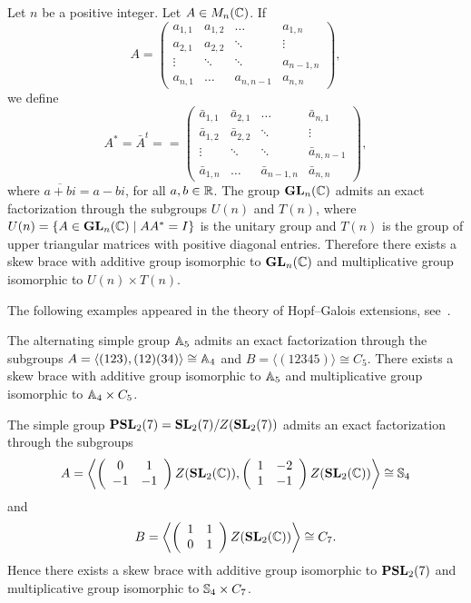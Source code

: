 \begin{example}
  \label{exa:QR}
  Let $n$ be a positive integer.  Let $A\in M_n(\mathbb{C})$. If 
  \[A=\left(\begin{array}{cccc}
  a_{1,1}&a_{1,2}&\ldots &a_{1,n}\\
  a_{2,1}&a_{2,2}&\ddots&\vdots\\
  \vdots&\ddots&\ddots&a_{n-1,n}\\
  a_{n,1}&\ldots&a_{n,n-1}&a_{n,n}\end{array}\right),\]
  we define
  \[A^*=\bar{A}^t= =\left(\begin{array}{cccc}
  \bar a_{1,1}&\bar a_{2,1}&\ldots &\bar a_{n,1}\\
  \bar a_{1,2}&\bar a_{2,2}&\ddots&\vdots\\
  \vdots&\ddots&\ddots&\bar a_{n,n-1}\\
  \bar a_{1,n}&\ldots&\bar a_{n-1,n}&\bar a_{n,n}\end{array}\right),\]
  where $\overline{a+bi}=a-bi$, for all $a,b\in\mathbb{R}$.
  The group $\mathbf{GL}_n(\mathbb{C})$ admits an
  exact factorization through the subgroups $U(n)$ and $T(n)$, where $U(n)=\{ A\in\mathbf{GL}_n(\mathbb{C})\mid AA^*=I\}$
  is the unitary group and $T(n)$ is the group of upper triangular matrices
  with positive diagonal entries.  Therefore there exists a skew brace with additive group 
  isomorphic to $\mathbf{GL}_n(\mathbb{C})$ and multiplicative group isomorphic to $U(n)\times T(n)$.  
\end{example}

The following examples appeared in the theory of Hopf--Galois 
extensions, see~\cite[Corollary 1.1]{MR3425626}.

\begin{example} 
	\label{exa:a5a4c5}
	The alternating simple group $\mathbb{A}_5$ admits an exact factorization
  through the subgroups 
  $A=\langle (123),(12)(34)\rangle\cong\mathbb{A}_4$ and 
  $B=\langle(12345)\rangle\cong C_5$.  
  There exists a skew brace with additive group isomorphic to $\mathbb{A}_5$ and multiplicative
  group isomorphic to $\mathbb{A}_4\times C_5$. 
\end{example}

\begin{example} 
	\label{exa:PSL27S4C7}
  The simple group $\mathbf{PSL}_2(7)=\mathbf{SL}_2(7)/Z(\mathbf{SL}_2(7))$ admits an exact factorization through the subgroups \[A=\left\langle\left(\begin{array}{cc}
  0&1\\
  -1&-1\end{array}\right)Z(\mathbf{SL}_2(\mathbb{C})),\left(\begin{array}{cc}
  1&-2\\
  1&-1\end{array}\right)Z(\mathbf{SL}_2(\mathbb{C}))\right\rangle\cong\mathbb{S}_4\] and \[B=\left\langle\left(\begin{array}{cc}
  1&1\\
  0&1\end{array}\right)Z(\mathbf{SL}_2(\mathbb{C}))\right\rangle\cong C_7.\] 
  Hence there exists a skew brace with additive
  group isomorphic to $\mathbf{PSL}_2(7)$ and multiplicative group isomorphic to 
  $\mathbb{S}_4\times C_7$.  
\end{example}

